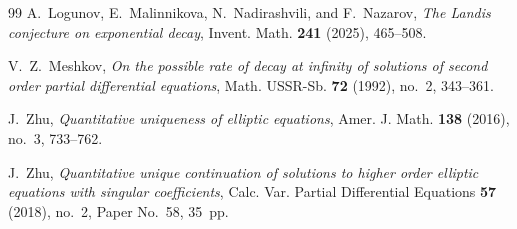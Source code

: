 \documentclass[11pt,a4paper,leqno]{amsart}
\numberwithin{equation}{section}
\theoremstyle{landisplain}
\theoremstyle{landisdefinition}
\theoremstyle{landisremark}
\begin{document}
\begin{thebibliography}{99}
A.~Logunov, E.~Malinnikova, N.~Nadirashvili, and F.~Nazarov,
\emph{The Landis conjecture on exponential decay},
Invent. Math. \textbf{241} (2025), 465--508.

V.~Z.~Meshkov,
\emph{On the possible rate of decay at infinity of solutions of
second order partial differential equations},
Math. USSR-Sb. \textbf{72} (1992), no.~2, 343--361.

J.~Zhu,
\emph{Quantitative uniqueness of elliptic equations},
Amer. J. Math. \textbf{138} (2016), no.~3, 733--762.

J.~Zhu,
\emph{Quantitative unique continuation of solutions to higher order
elliptic equations with singular coefficients},
Calc. Var. Partial Differential Equations \textbf{57} (2018), no.~2,
Paper No.~58, 35~pp.

\end{thebibliography}
\end{document}
